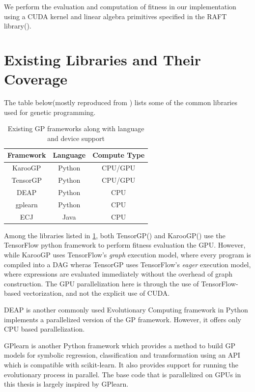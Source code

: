 We perform the evaluation and computation of fitness in our implementation using a CUDA kernel and linear algebra primitives specified in the RAFT library(\citep{raschka2020machine}).

\section{Existing Libraries and Their Coverage}
\label{sec:otherlibs}
The table below(mostly reproduced from \cite{baeta2021speed}) lists some of the common libraries  used for genetic programming.  

\begin{table}[htbp]
  \caption{Existing GP frameworks along with language and device support}
  \begin{center}
      \begin{tabular}[c]{ccc}
          \toprule
          \textbf{Framework} &   \textbf{Language} & \textbf{Compute Type} \\
          \midrule
          KarooGP & Python & CPU/GPU \\
          TensorGP & Python & CPU/GPU \\
          DEAP & Python & CPU \\
          gplearn  & Python & CPU \\
          ECJ & Java & CPU \\
          \bottomrule
      \end{tabular}
      \label{tab:otherlibs}
  \end{center}
\end{table}

Among the libraries listed in \cref{tab:otherlibs}, both TensorGP(\citep{baeta2021tensorgp}) and KarooGP(\citep{staats2017tensorflow}) use the TensorFlow python framework to perform fitness evaluation the GPU. However, while KarooGP uses TensorFlow's \textit{graph} execution model, where every program is compiled into a DAG wheras TensorGP uses TensorFlow's \textit{eager} execution model\citep{agrawal2019tensorflow}, where expressions are evaluated immediately without the overhead of graph construction. The GPU parallelization here is through the use of TensorFlow-based vectorization, and not the explicit use of CUDA. 

DEAP \citep{DEAP_JMLR2012} is another commonly used Evolutionary Computing framework in Python implements a parallelized version of the GP framework. However, it offers only CPU based parallelization. 

GPlearn\citep{gplearn} is another Python framework which provides a method to build GP models for symbolic regression, classification and transformation using an API which is compatible with scikit-learn\citep{scikit-learn}. It also provides support for running the evolutionary process in parallel. The base code that is parallelized on GPUs in this thesis is largely inspired by GPlearn. 

